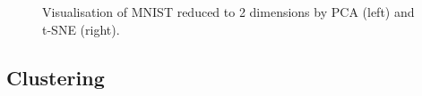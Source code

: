 \documentclass[11pt]{article}
\begin{document}
\begin{figure}[h]
    \centering
    \begin{minipage}{0.45\textwidth}
        \centering
    \end{minipage}\hfill
    \begin{minipage}{0.45\textwidth}
        \centering
    \end{minipage}
    \caption{Visualisation of MNIST reduced to 2 dimensions by PCA (left) and t-SNE (right).}
    \label{mnistvis}
\end{figure}


\subsection{Clustering}
\label{kmeans}
\end{document}
